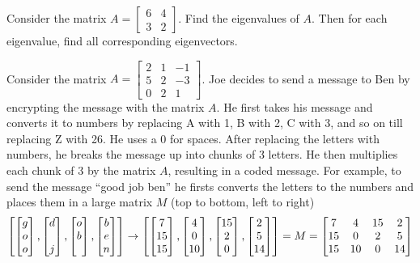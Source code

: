 \begin{problem}
Consider the matrix 
$
A=
\begin{bmatrix}
 6 & 4  \\
 3 & 2  
\end{bmatrix}
$. 
Find the eigenvalues of $A$. 
Then for each eigenvalue, find all corresponding eigenvectors.
\end{problem}







\mysubsection{\ideamul}

\begin{problem}[Encryption]
Consider the matrix 
$A =
\begin{bmatrix}
 2&1&-1\\
 5&2&-3\\
 0&2&1
\end{bmatrix}
$.  
Joe decides to send a message to Ben by encrypting the message with the matrix $A$. He first takes his message and converts it to numbers by replacing A with 1, B with 2, C with 3, and so on till replacing Z with 26.  He uses a 0 for spaces.  After replacing the letters with numbers, he breaks the message up into chunks of 3 letters.  He then multiplies each chunk of 3 by the matrix $A$, resulting in a coded message. For example, to send the message ``good job ben'' he firsts converts the letters to the numbers and places them in a large matrix $M$ (top to bottom, left to right) 
$$
\left[\bvec{g\\o\\o}, \bvec{d\\ \ \\ j},\bvec{o\\b\\\  },\bvec{b\\e\\n}\right] 
\rightarrow
\left[\bvec{7\\15\\15}, \bvec{4\\0\\10},\bvec{15\\2\\0},\bvec{2\\5\\14}\right] 
= M=
\begin{bmatrix}
7 & 4 & 15 & 2 \\
15 & 0 & 2 & 5 \\
15 & 10 & 0 & 14  

\end{bmatrix}$$
\end{problem}

